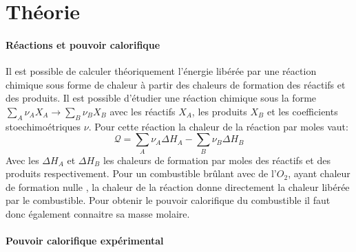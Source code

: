\section{Théorie}


\paragraph*{Réactions et pouvoir calorifique}
Il est possible de calculer théoriquement l'énergie libérée par une réaction chimique sous forme de chaleur à partir des chaleurs de formation des réactifs et des produits. Il est possible d'étudier une réaction chimique sous la forme \(\sum_{A} \nu_A X_A \to \sum_{B} \nu_B X_B\) avec les réactifs \(X_A\), les produits \(X_B\) et les coefficients stoechimoétriques \(\nu\). Pour cette réaction la chaleur de la réaction par moles vaut:
\begin{equation}
    \mathcal{Q} = \sum_{A} \nu_A \Delta H_A - \sum_{B} \nu_B \Delta H_B
    \label{eq:chaleur_réaction}
\end{equation}
Avec les \(\Delta H_A\) et \(\Delta H_B\) les chaleurs de formation par moles des réactifs et des produits respectivement. Pour un combustible brûlant avec de l'\(O_2\), ayant chaleur de formation nulle \cite{notice}, la chaleur de la réaction donne directement la chaleur libérée par le combustible. Pour obtenir le pouvoir calorifique du combustible il faut donc également connaitre sa masse molaire.


\paragraph*{Pouvoir calorifique expérimental}

